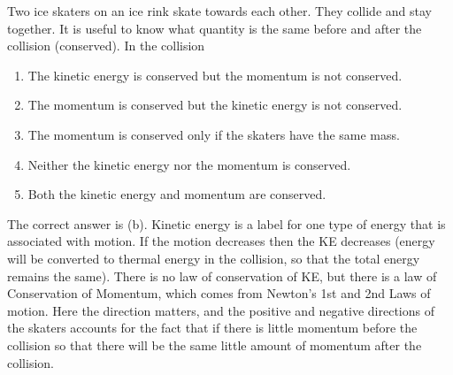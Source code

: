 
\begin{problem}[Robin2]
{Two ice skaters on an ice rink skate towards each other. They collide and stay together. It is useful to know what quantity is the same before and after the collision (conserved). In the collision 
\begin{enumerate}
	\item The kinetic energy is conserved but the momentum is not conserved.
	\item The momentum is conserved but the kinetic energy is not conserved. \answer
	\item The momentum is conserved only if the skaters have the same mass.
	\item Neither the kinetic energy nor the momentum is conserved. 
	\item Both the kinetic energy and momentum are conserved.
\end{enumerate}
}
{}
{The correct answer is (b).  Kinetic energy is a label for one type of energy that is associated with motion. If the motion decreases then the KE decreases (energy will be converted to thermal energy in the collision, so that the total energy remains the same). There is no law of conservation of KE, but there is a law of Conservation of Momentum, which comes from Newton's 1st and 2nd  Laws of motion. Here the direction matters, and the positive and negative directions of the skaters accounts for the fact that if there is little momentum before the collision so that there will be the same little amount of momentum after the collision.}
\end{problem}